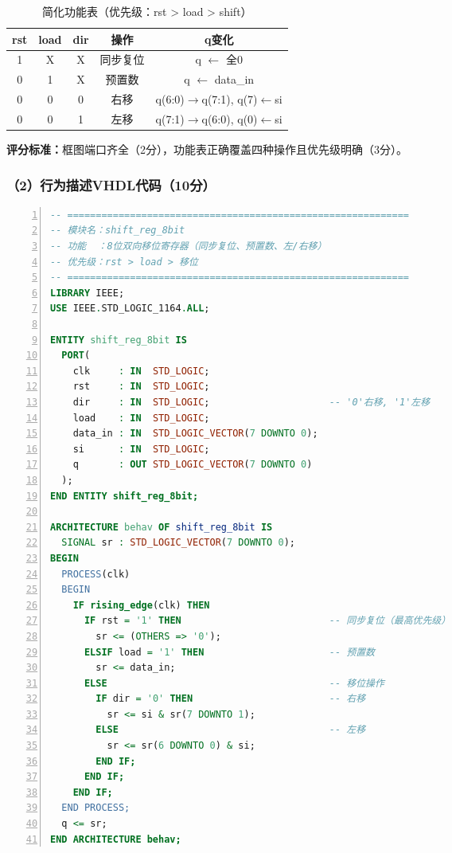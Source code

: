\begin{table}[h]
\centering
\caption{简化功能表（优先级：rst > load > shift）}
\begin{tabular}{|c|c|c|c|c|}
\hline
\textbf{rst} & \textbf{load} & \textbf{dir} & \textbf{操作} & \textbf{q变化} \\
\hline
1 & X & X & 同步复位 & q $\leftarrow$ 全0 \\
0 & 1 & X & 预置数 & q $\leftarrow$ data\_in \\
0 & 0 & 0 & 右移 & q(6:0)$\to$q(7:1), q(7)$\leftarrow$si \\
0 & 0 & 1 & 左移 & q(7:1)$\to$q(6:0), q(0)$\leftarrow$si \\
\hline
\end{tabular}
\end{table}

\textbf{评分标准：}框图端口齐全（2分），功能表正确覆盖四种操作且优先级明确（3分）。

\subsubsection*{（2）行为描述VHDL代码（10分）}

\begin{lstlisting}[language=VHDL, numbers=left, caption={8位双向移位寄存器——行为描述}]
-- ============================================================
-- 模块名：shift_reg_8bit
-- 功能  ：8位双向移位寄存器（同步复位、预置数、左/右移）
-- 优先级：rst > load > 移位
-- ============================================================
LIBRARY IEEE;
USE IEEE.STD_LOGIC_1164.ALL;

ENTITY shift_reg_8bit IS
  PORT(
    clk     : IN  STD_LOGIC;
    rst     : IN  STD_LOGIC;
    dir     : IN  STD_LOGIC;                     -- '0'右移, '1'左移
    load    : IN  STD_LOGIC;
    data_in : IN  STD_LOGIC_VECTOR(7 DOWNTO 0);
    si      : IN  STD_LOGIC;
    q       : OUT STD_LOGIC_VECTOR(7 DOWNTO 0)
  );
END ENTITY shift_reg_8bit;

ARCHITECTURE behav OF shift_reg_8bit IS
  SIGNAL sr : STD_LOGIC_VECTOR(7 DOWNTO 0);
BEGIN
  PROCESS(clk)
  BEGIN
    IF rising_edge(clk) THEN
      IF rst = '1' THEN                          -- 同步复位（最高优先级）
        sr <= (OTHERS => '0');
      ELSIF load = '1' THEN                      -- 预置数
        sr <= data_in;
      ELSE                                       -- 移位操作
        IF dir = '0' THEN                        -- 右移
          sr <= si & sr(7 DOWNTO 1);
        ELSE                                     -- 左移
          sr <= sr(6 DOWNTO 0) & si;
        END IF;
      END IF;
    END IF;
  END PROCESS;
  q <= sr;
END ARCHITECTURE behav;
\end{lstlisting}

